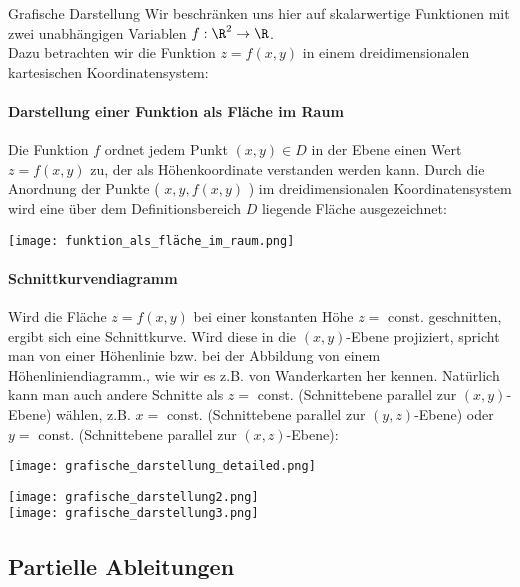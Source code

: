 \begin{concept}{Grafische Darstellung}
    Wir beschränken uns hier auf skalarwertige Funktionen mit zwei unabhängigen Variablen $f: \R^2 \to \R$.\\
    Dazu betrachten wir die Funktion $z = f(x, y)$ in einem dreidimensionalen kartesischen Koordinatensystem:
    
    \paragraph{Darstellung einer Funktion als Fläche im Raum}
    Die Funktion $f$ ordnet jedem Punkt $(x, y) \in D$ in der Ebene einen Wert $z=f(x, y)$ zu, der als Höhenkoordinate verstanden werden kann. 
    Durch die Anordnung der Punkte ( $x, y, f(x, y)$ ) im dreidimensionalen Koordinatensystem wird eine über dem Definitionsbereich $D$ liegende Fläche ausgezeichnet:

    \texttt{[image: funktion\_als\_fläche\_im\_raum.png]}
    
    \paragraph{Schnittkurvendiagramm}
    Wird die Fläche $z=f(x, y)$ bei einer konstanten Höhe $z=$ const. geschnitten, ergibt sich eine Schnittkurve. 
    Wird diese in die $(x, y)$-Ebene projiziert, spricht man von einer Höhenlinie bzw. bei der Abbildung von einem Höhenliniendiagramm., wie wir es z.B. von Wanderkarten her kennen. 
    Natürlich kann man auch andere Schnitte als $z=$ const. (Schnittebene parallel zur $(x, y)$-Ebene) wählen, z.B. $x=$ const. (Schnittebene parallel zur $(y, z)$-Ebene) oder $y=$ const. (Schnittebene parallel zur $(x, z)$-Ebene):

    \begin{minipage}{0.6\linewidth}
    \texttt{[image: grafische\_darstellung\_detailed.png]}
    \end{minipage}
    \begin{minipage}{0.38\linewidth}
    \texttt{[image: grafische\_darstellung2.png]}\\
    \texttt{[image: grafische\_darstellung3.png]}
    \end{minipage}
\end{concept}

\subsection{Partielle Ableitungen}

